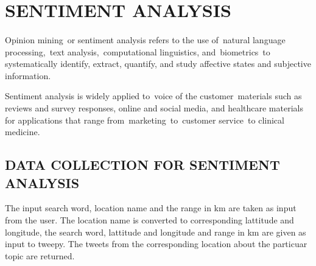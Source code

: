 \section{SENTIMENT ANALYSIS}
\paragraph{}
Opinion mining or sentiment analysis refers to the use of natural language processing, text analysis, computational linguistics, and biometrics to systematically identify, extract, quantify, and study affective states and subjective information.

Sentiment analysis is widely applied to voice of the customer materials such as reviews and survey responses, online and social media, and healthcare materials for applications that range from marketing to customer service to clinical medicine.


\subsection{DATA COLLECTION FOR SENTIMENT ANALYSIS}
The input search word, location name and the range in km are taken as input from the user. The location name is converted to corresponding lattitude and longitude, the search word, lattitude and longitude and range in km are given as input to tweepy. The tweets from the corresponding location about the particuar topic are returned. 

